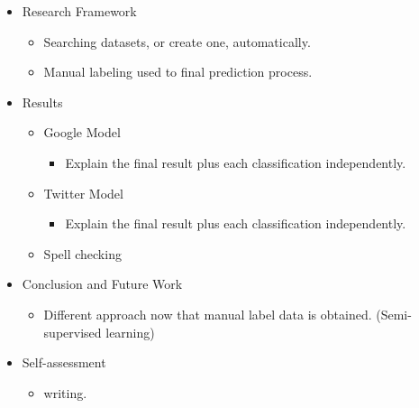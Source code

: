 \begin{itemize}
  \item Research Framework
  \begin{itemize}
    \item Searching datasets, or create one, automatically.
    \item Manual labeling used to final prediction process.
  \end{itemize}

  \item Results
  \begin{itemize}
    \item Google Model
    \begin{itemize}
      \item Explain the final result plus each classification independently.
    \end{itemize}
    \item Twitter Model
    \begin{itemize}
      \item Explain the final result plus each classification independently. 
    \end{itemize}
    \item Spell checking
  \end{itemize}

  \item Conclusion and Future Work
    \begin{itemize}
      \item Different approach now that manual label data is obtained.  (Semi-supervised learning) 
    \end{itemize}
  
  \item Self-assessment
  \begin{itemize}
    \item writing.
  \end{itemize}
\end{itemize}

\fi
